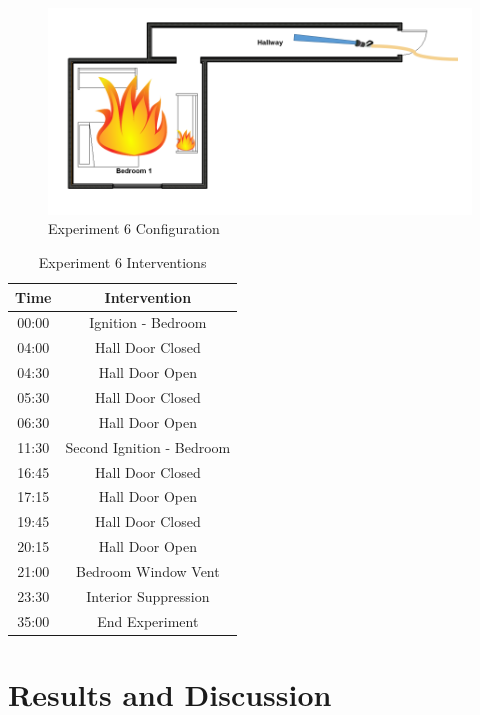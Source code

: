 \documentclass[12pt,oneside]{book}
\begin{document}
\begin{figure}[H]
	\centering
	\includegraphics[width=5in]{Howard_Exp_6.png}
	\caption{Experiment 6 Configuration}
	\label{fig:Exp6Config}
\end{figure}

\begin{table}[H]
	\centering
	\caption{Experiment 6 Interventions}
	\begin{tabular}{|c|c|} 
		\hline
		Time & Intervention \\ \hline \hline
		00:00 & Ignition - Bedroom \\ \hline
		04:00 & Hall Door Closed \\ \hline
		04:30 & Hall Door Open \\ \hline
		05:30 & Hall Door Closed \\ \hline
		06:30 & Hall Door Open \\ \hline
		11:30 & Second Ignition - Bedroom \\ \hline
		16:45 & Hall Door Closed \\ \hline
		17:15 & Hall Door Open \\ \hline
		19:45 & Hall Door Closed \\ \hline
		20:15 & Hall Door Open \\ \hline
		21:00 & Bedroom Window Vent \\ \hline
		23:30 & Interior Suppression \\ \hline
		35:00 & End Experiment\\ \hline
	\end{tabular}
	\label{Table:Exp6Interventions}
\end{table}

\clearpage

\chapter{Results and Discussion}
\end{document}
